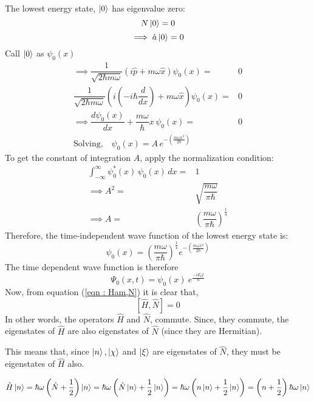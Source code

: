 \documentclass[12pt,a4paper,answers]{exam}
\newcommand{\p}{\hat{p}}
\newcommand{\x}{\hat{x}}
\renewcommand{\a}{\hat{a}}
\newcommand{\N}{\hat{N}}
\begin{document}
\begin{questions}
\begin{solutionorbox}
		The lowest energy state, $ \ket{0} $ has eigenvalue zero:
		\begin{equation}
			N \ket{0} = 0
		\end{equation}
		\[ \implies \a \ket{0} = 0 \]
		Call $ \ket{0} $ as $ \psi_0(x) $
		\begin{eqnarray*}
			\implies \dfrac{1}{\sqrt{2\hbar m \omega}} \left( i\p + m\omega\x \right) \psi_0(x) =& 0\\
			\dfrac{1}{\sqrt{2\hbar m \omega}} \left( i\left(-i\hbar\dfrac{d}{dx}\right) + m\omega\x \right) \psi_0(x) =& 0\\
			\implies \dfrac{d\psi_0 (x)}{dx} + \dfrac{m\omega}{\hbar}x\, \psi_0 (x) =& 0\\
			\text{Solving,}\quad \psi_0 (x) = A\, e^{-\left(\frac{m\omega x^2}{2\hbar}\right)}
		\end{eqnarray*}
		To get the constant of integration $ A $, apply the normalization condition:
		\begin{eqnarray*}
			\int_{-\infty}^{\infty} \psi_{0}^{*} (x)\, \psi_0 (x)\, dx =& 1\\
			\implies A^2 =& \sqrt{\dfrac{m\omega}{\pi\hbar}}\\
			\implies A = & \left(\dfrac{m\omega}{\pi\hbar}\right)^{\frac{1}{4}}
		\end{eqnarray*}
		Therefore, the time-independent wave function of the lowest energy state is:
		\begin{equation}\label{eqn : zero-state}
			\boxed{\psi_{0}(x) = \left( \dfrac{m\omega}{\pi\hbar} \right)^{\frac{1}{4}} e^{-\left(\frac{m\omega x^2}{2\hbar}\right)}}
		\end{equation}
		The time dependent wave function is therefore
		\begin{dmath}
			\Psi_0 (x,t) = \psi_{0}(x)\ e^{\frac{-iE_0 t}{\hbar}}
		\end{dmath}
		Now, from equation (\ref{eqn : Ham,N}) it is clear that, 
		\[	[\hat{H} , \N] = 0	\]
		In other words, the operators $ \hat{H} $ and $ \N $, commute. Since, they commute, the eigenstates of $ \hat{H} $ are also eigenstates of $ \N $ (since they are Hermitian).
		
		This means that, since $ \ket{n} , \ket{\chi}$ and $\ket{\xi}$ are eigenstates of $ \N $, they must be eigenstates of $ \hat{H} $ also.
		
		\begin{dmath}
			\hat{H} \ket{n} 
			= \hbar \omega \left( \N + \dfrac{1}{2} \right) \ket{n}
			= \hbar \omega \left( \N \ket{n} + \dfrac{1}{2} \ket{n} \right)
			= \hbar \omega \left( n \ket{n} + \dfrac{1}{2} \ket{n} \right)
			= \left( n + \dfrac{1}{2} \right) \hbar \omega \ket{n}
		\end{dmath}
		

\end{solutionorbox}
\end{questions}
\end{document}
